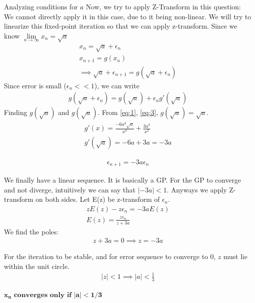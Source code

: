 \documentclass{beamer}
\begin{document}
\begin{frame}{Analyzing conditions for $a$}
    Now, we try to apply Z-Transform in this question:
We cannot directly apply it in this case, due to it being non-linear. We will try to linearize this fixed-point iteration so that we can apply z-transform. Since we know  $\lim\limits_{n\to\infty} x_n = \sqrt{a}$
\begin{align}
x_{n} = \sqrt{a} + \epsilon_n \label{eq:2}\\
x_{n+1} = g(x_{n})\\
\implies \sqrt{a} + \epsilon_{n+1} = g(\sqrt{a} + \epsilon_n)
\end{align}
Since error is small ($\epsilon_n << 1$), we can write
\begin{align}
    g(\sqrt{a} + \epsilon_n) = g(\sqrt{a}) + \epsilon_ng'(\sqrt{a})
\end{align}
Finding $g(\sqrt{a})$ and $g(\sqrt{a})$.
From \eqref{eq:1}, \eqref{eq:3}, $g(\sqrt{a}) = \sqrt{a}$.
\begin{align}
    g'(x) = \frac{-6a^2\sqrt{a}}{x^3} + \frac{3a^2}{x^2}\\
    g'(\sqrt{a}) = -6a + 3a = -3a
\end{align}

\begin{align}
    \epsilon_{n+1} = -3a\epsilon_n
\end{align}

We finally have a linear sequence. It is basically a GP. For the GP to converge and not diverge, intuitively we can say that $|-3a| < 1$.
Anyways we apply Z-transform on both sides. Let E(z) be z-transform of $\epsilon_n$.
\begin{align}
    zE(z) - z\epsilon_n = -3aE(z) \\
    E(z) = \frac{z\epsilon_n}{z+3a}
\end{align}
We find the poles:
\begin{align}
    z + 3a = 0 \implies z = -3a
\end{align}

For the iteration to be stable, and for error sequence to converge to 0, $z$ must lie within the unit circle. 
\begin{align}
    |z| < 1 \implies |a| < \frac{1}{3}
\end{align}
\begin{center}
$\boxed{\mathbf{x_n} \textbf{ converges only if } \mathbf{|a| < 1/3}}$
\end{center}
\end{frame}
\end{document}

